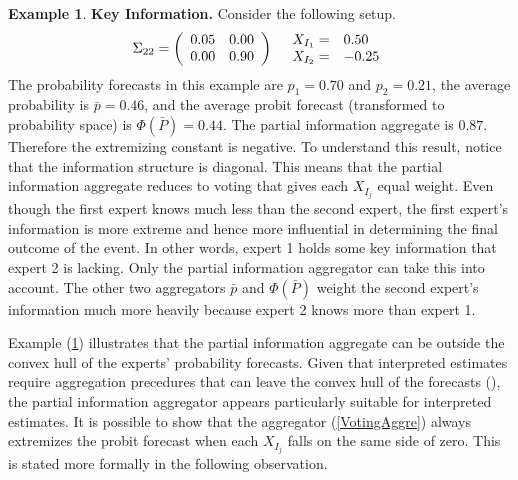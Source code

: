 \documentclass[11pt,twoside]{article}
\theoremstyle{definition}
\newtheorem{example}[theorem]{Example}
\theoremstyle{definition}
\begin{document}
\begin{example}
\label{KeyInfo}
\textbf{Key Information.} Consider the following setup.
\begin{align*}
\Sigma_{22} =  \left(\begin{array}{c c}
0.05 & 0.00\\
0.00 & 0.90 \\
 \end{array}\right)
  && 
  \begin{array}{l l}
X_{I_1} =& 0.50\\
X_{I_2} =& -0.25
 \end{array}
\end{align*}
The probability forecasts in this example are $p_1 = 0.70$ and $p_2 = 0.21$, the average probability is $\bar{p} = 0.46$, and the average probit forecast (transformed to probability space) is $\Phi(\bar{P}) = 0.44$.  The partial information aggregate is $0.87$. Therefore the extremizing constant is negative. To understand this result, notice that the information structure is diagonal. This means that the partial information aggregate reduces to voting that gives each $X_{I_j}$ equal weight. Even though the first expert knows much less than the second expert, the first expert's information is more extreme and hence more influential in determining the final outcome of the event. In other words, expert 1 holds some key information that expert 2 is lacking. Only the partial information aggregator can take this into account. The other two aggregators $\bar{p}$ and $\Phi(\bar{P})$ weight the second expert's information much more heavily because expert 2 knows more than expert 1.
\end{example}

Example (\ref{KeyInfo}) illustrates that the partial information aggregate can be outside the convex hull of the experts' probability forecasts. Given that interpreted estimates require aggregation precedures that can leave the convex hull of the forecasts (\cite{parunak2013characterizing}), the partial information aggregator appears particularly suitable for interpreted estimates. It is possible to show that the aggregator (\ref{VotingAggre}) always extremizes the probit forecast when each $X_{I_j}$ falls on the same side of zero. This is stated more formally in the following observation.
 
\end{document}
